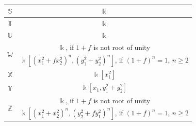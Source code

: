 \documentclass{amsart}
\theoremstyle{definition}
\theoremstyle{remark}
\numberwithin{equation}{section}
\begin{document}
\begin{table}[H]
{\begin{tabular}{ |c|c| }
\hline
$\mathbb{S}$ & $\Bbbk$ \\ 
\hline
$\mathbb{T}$ & $\Bbbk$ \\ 
\hline
$\mathbb{U}$ & $\Bbbk$ \\ 
\hline
\multirow{2}{*}{$\mathbb{W}$} & $\Bbbk$, if $1+f$ is not root of unity \\ \cline{2-2}
& $\Bbbk[(x_1^2+fx_2^2)^n,(y_1^2+y_2^2)^n]$, if $(1+f)^n=1$, $n \geq 2$ \\ 
\hline
$\mathbb{X}$ & $\Bbbk[x_1^2]$ \\ 
\hline
$\mathbb{Y}$ & $\Bbbk[x_1,y_1^2+y_2^2]$ \\ 
\hline
\multirow{2}{*}{$\mathbb{Z}$} & $\Bbbk$, if $1+f$ is not root of unity \\ \cline{2-2}
& $\Bbbk[(x_1^2+x_2^2)^n,(y_2^2+fy_1^2)^n]$, if $(1+f)^n=1$, $n \geq 2$ \\ 
\hline
\end{tabular}
}
\end{table}
\end{document}
